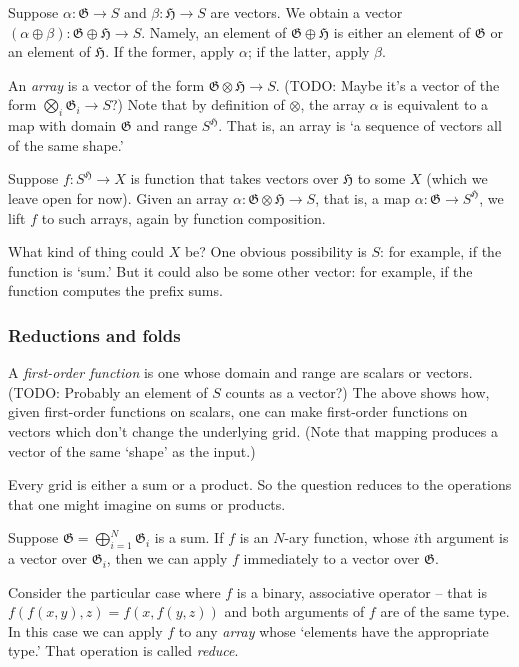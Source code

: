 \documentclass[11pt]{article}
\newcommand{\gr}[1]{\mathfrak{#1}}
\begin{document}
Suppose \(\alpha : \gr{G}\to S\) and \(\beta : \gr{H}\to S\) are vectors. We obtain
a vector \((\alpha\oplus\beta) : \gr{G}\oplus\gr{H}\to S\). Namely, an element of
\(\gr{G}\oplus\gr{H}\) is either an element of \(\gr{G}\) or an element of
\(\gr{H}\). If the former, apply \(\alpha\); if the latter, apply \(\beta\). 

An \emph{array} is a vector of the form \(\gr{G}\otimes\gr{H}\to S\). (TODO: Maybe it's
a vector of the form \(\bigotimes_i \gr{G}_i\to S\)?) Note that by definition of
\(\otimes\), the array \(\alpha\) is equivalent to a map with domain \(\gr{G}\) and
range \(S^\gr{H}\). That is, an array is ‘a sequence of vectors all of the same
shape.’

Suppose \(f:S^\gr{H}\to X\) is function that takes vectors over \(\gr{H}\) to
some \(X\) (which we leave open for now). Given an array \(\alpha : \gr{G}\otimes
\gr{H}\to S\), that is, a map \(\alpha : \gr{G}\to S^\gr{H}\), we lift \(f\) to
such arrays, again by function composition.

What kind of thing could \(X\) be? One obvious possibility is \(S\): for example, if
the function is ‘sum.’ But it could also be some other vector: for example, if
the function computes the prefix sums. 

\subsubsection{Reductions and folds}
\label{sec:org1f2a8ac}

A  \emph{first-order  function}  is  one  whose  domain  and  range  are  scalars  or
vectors. (TODO: Probably an element of \(S\)  counts as a vector?) The above shows
how, given first-order functions on  scalars, one can make first-order functions
on vectors which don't change the underlying grid. (Note that mapping produces a
vector of the same `shape' as the input.)

Every grid is either a sum or a product. So the question reduces to the
operations that one might imagine on sums or products. 

Suppose \(\gr{G} = \bigoplus_{i = 1}^N \gr{G}_i\) is a sum. If \(f\) is an \(N\)-ary
function, whose \(i\)th argument is a vector over \(\gr{G}_i\), then we can apply
\(f\) immediately to a vector over \(\gr{G}\).

Consider the particular case where \(f\) is a binary, associative operator -- that
is \(f(f(x, y), z) = f(x, f(y, z))\) and both arguments of \(f\) are of the same
type. In this case we can apply \(f\) to any \emph{array} whose ‘elements have the
appropriate type.’ That operation is called \emph{reduce}.
\end{document}

